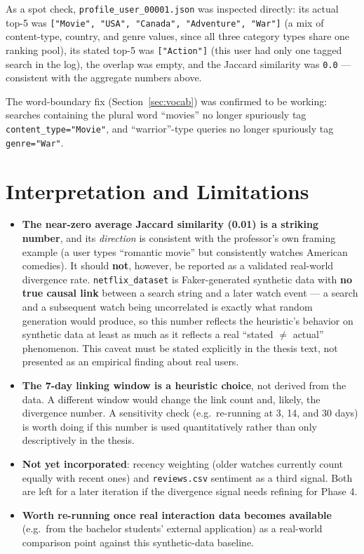 \documentclass[11pt,a4paper]{article}
\newcommand{\code}[1]{\texttt{#1}}
\begin{document}
As a spot check, \code{profile\_user\_00001.json} was inspected directly: its actual top-5 was
\code{["Movie", "USA", "Canada", "Adventure", "War"]} (a mix of content-type, country, and genre
values, since all three category types share one ranking pool), its stated top-5 was
\code{["Action"]} (this user had only one tagged search in the log), the overlap was empty, and
the Jaccard similarity was \code{0.0} --- consistent with the aggregate numbers above.

The word-boundary fix (Section~\ref{sec:vocab}) was confirmed to be working: searches containing
the plural word ``movies'' no longer spuriously tag \code{content\_type="Movie"}, and
``warrior''-type queries no longer spuriously tag \code{genre="War"}.

\section{Interpretation and Limitations}

\begin{itemize}
    \item \textbf{The near-zero average Jaccard similarity (0.01) is a striking number}, and its
        \emph{direction} is consistent with the professor's own framing example (a user types
        ``romantic movie'' but consistently watches American comedies). It should \textbf{not},
        however, be reported as a validated real-world divergence rate. \code{netflix\_dataset} is
        Faker-generated synthetic data with \textbf{no true causal link} between a search string
        and a later watch event --- a search and a subsequent watch being uncorrelated is exactly
        what random generation would produce, so this number reflects the heuristic's behavior on
        synthetic data at least as much as it reflects a real ``stated $\neq$ actual''
        phenomenon. This caveat must be stated explicitly in the thesis text, not presented as an
        empirical finding about real users.
    \item \textbf{The 7-day linking window is a heuristic choice}, not derived from the data. A
        different window would change the link count and, likely, the divergence number. A
        sensitivity check (e.g.\ re-running at 3, 14, and 30 days) is worth doing if this number
        is used quantitatively rather than only descriptively in the thesis.
    \item \textbf{Not yet incorporated}: recency weighting (older watches currently count equally
        with recent ones) and \code{reviews.csv} sentiment as a third signal. Both are left for a
        later iteration if the divergence signal needs refining for Phase 4.
    \item \textbf{Worth re-running once real interaction data becomes available} (e.g.\ from the
        bachelor students' external application) as a real-world comparison point against this
        synthetic-data baseline.
\end{itemize}
\end{document}
